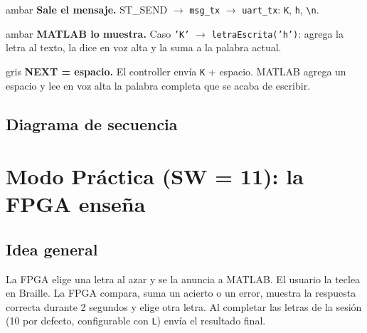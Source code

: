 \documentclass[11pt,a4paper]{article}
\newcommand{\cod}[1]{\texttt{#1}}
\begin{document}
\begin{paso}{ambar}
\textbf{Sale el mensaje.} ST\_SEND $\to$ \cod{msg\_tx} $\to$
\cod{uart\_tx}: \cod{K}, \cod{h}, \cod{\textbackslash n}.
\end{paso}

\begin{paso}{ambar}
\textbf{MATLAB lo muestra.} Caso \cod{'K'} $\to$ \cod{letraEscrita('h')}:
agrega la letra al texto, la dice en voz alta y la suma a la palabra actual.
\end{paso}

\begin{paso}{gris}
\textbf{NEXT = espacio.} El controller envía \cod{K} + espacio. MATLAB
agrega un espacio y lee en voz alta la palabra completa que se acaba de escribir.
\end{paso}

\subsection{Diagrama de secuencia}
\begin{center}
\end{center}

\section{Modo Práctica (SW = 11): la FPGA enseña}

\subsection{Idea general}
La FPGA elige una letra al azar y se la anuncia a MATLAB. El usuario la teclea en
Braille. La FPGA compara, suma un acierto o un error, muestra la respuesta correcta
durante 2 segundos y elige otra letra. Al completar las letras de la sesión (10 por
defecto, configurable con \cod{L}) envía el resultado final.
\end{document}
